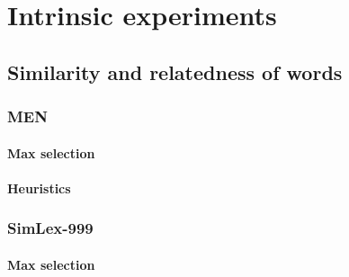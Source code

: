 \chapter{Intrinsic experiments}
\label{cha:experiments}

\section{Similarity and relatedness of words}
\label{sec:lexical}




\subsection{MEN}
\label{sec:men}

\subsubsection{Max selection}
\label{sec:max-selection-men}

\subsubsection{Heuristics}
\label{sec:heuristics-men}


\subsection{SimLex-999}
\label{sec:simlex-999}

\subsubsection{Max selection}
\label{sec:max-selection-simlex}


